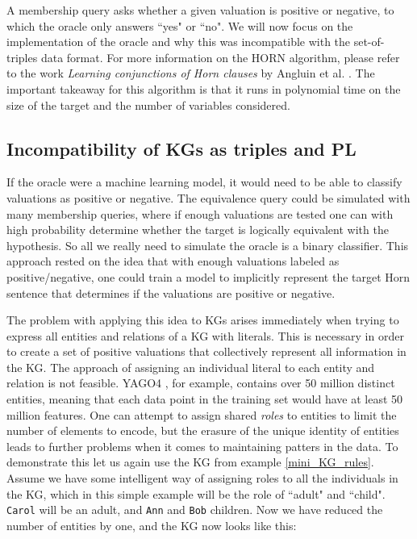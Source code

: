 A membership query asks whether a given valuation is positive or negative, to which the oracle only answers ``yes" or ``no". We will now focus on the implementation of the oracle and why this was incompatible with the set-of-triples data format. For more information on the HORN algorithm, please refer to the work \textit{Learning conjunctions of Horn clauses} by Angluin et al. \cite{DBLP:journals/ml/AngluinFP92}. The important takeaway for this algorithm is that it runs in polynomial time on the size of the target and the number of variables considered.


\subsection{Incompatibility of KGs as triples and PL}
If the oracle were a machine learning model, it would need to be able to classify valuations as positive or negative. The equivalence query could be simulated with many membership queries, where if enough valuations are tested one can with high probability determine whether the target is logically equivalent with the hypothesis. So all we really need to simulate the oracle is a binary classifier. This approach rested on the idea that with enough valuations labeled as positive/negative, one could train a model to implicitly represent the target Horn sentence that determines if the valuations are positive or negative. 

The problem with applying this idea to KGs arises immediately when trying to express all entities and relations of a KG with literals. This is necessary in order to create a set of positive valuations that collectively represent all information in the KG. The approach of assigning an individual literal to each entity and relation is not feasible. YAGO4 \cite{yago4}, for example, contains over 50 million distinct entities, meaning that each data point in the training set would have at least 50 million features. One can attempt to assign shared \textit{roles} to entities to limit the number of elements to encode, but the erasure of the unique identity of entities leads to further problems when it comes to maintaining patters in the data. To demonstrate this let us again use the KG from example \ref{mini_KG_rules}. Assume we have some intelligent way of assigning roles to all the individuals in the KG, which in this simple example will be the role of ``adult" and ``child". \texttt{Carol} will be an adult, and \texttt{Ann} and \texttt{Bob} children. Now we have reduced the number of entities by one, and the KG now looks like this:

